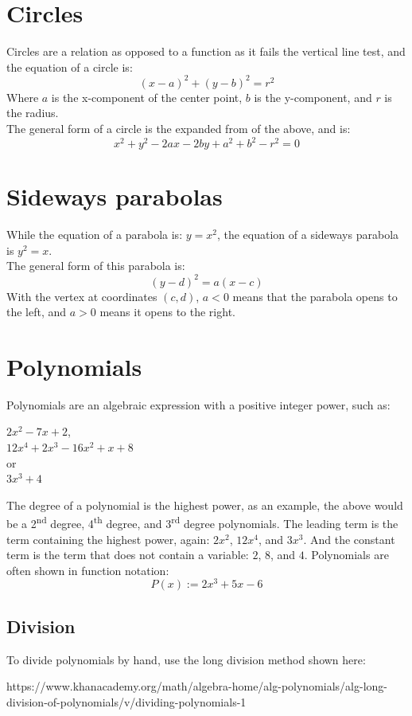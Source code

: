 \documentclass{book}
\begin{document}
\chapter{Circles}
Circles are a relation as opposed to a function as it fails the vertical line test, and the equation of a circle is:
\[
	(x - a)^2 + (y - b)^2 = r^2
\]
Where $a$ is the x-component of the center point,  $b$ is the y-component, and $r$ is the radius.\\

The general form of a circle is the expanded from of the above, and is:
\[
	x^2 + y^2 - 2ax - 2by + a^2 + b^2 -r^2 = 0
\]

\chapter{Sideways parabolas}
While the equation of a parabola is: $y = x^2$, the equation of a sideways parabola is $y^2 = x$.\\

The general form of this parabola is:
\[
	(y - d)^2 = a(x - c)
\]
With the vertex at coordinates $(c, d)$, $a < 0$ means that the parabola opens to the left, and $a > 0$ means it opens to the right.

\chapter{Polynomials}
Polynomials are an algebraic expression with a positive integer power, such as:
\begin{center}
	$2x^2 - 7x + 2$,\\
	$12x^4 + 2x^3 - 16x^2 + x + 8$\\
	or\\
	$3x^3 + 4$
\end{center}
The degree of a polynomial is the highest power, as an example, the above would be a 2\textsuperscript{nd} degree, 4\textsuperscript{th} degree, and 3\textsuperscript{rd} degree polynomials.  The leading term is the term containing the highest power, again: $2x^2$, $12x^4$, and $3x^3$.  And the constant term is the term that does not contain a variable: $2$, $8$, and $4$.  Polynomials are often shown in function notation:
\[
	P(x) := 2x^3 + 5x - 6
\]

\section{Division}
To divide polynomials by hand, use the long division method shown here:
\begin{center}
	https://www.khanacademy.org/math/algebra-home/alg-polynomials/alg-long-division-of-polynomials/v/dividing-polynomials-1
\end{center}
\end{document}
